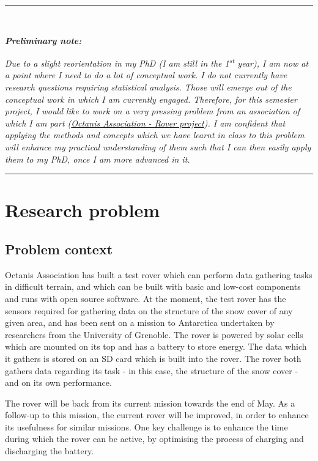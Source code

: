 \documentclass[11pt, UKenglish]{report}
\newcommand{\HRule}[1]{\rule{\linewidth}{#1}}
\begin{document}
\noindent \HRule{0.5pt} \\
\large{\textit{\textbf{Preliminary note:}}

\normalsize

\noindent \textit{Due to a slight reorientation in my PhD (I am still in the 1\textsuperscript{st} year), I am now at a point where I need to do a lot of conceptual work. I do not currently have research questions requiring statistical analysis. Those will emerge out of the conceptual work in which I am currently engaged. Therefore, for this semester project, I would like to work on a very pressing problem from an association of which I am part (\href{http://octanis.org/rover/} {Octanis Association - Rover project}). I am confident that applying the methods and concepts which we have learnt in class to this problem will enhance my practical understanding of them such that I can then easily apply them to my PhD, once I am more advanced in it.}

\noindent \HRule{0.5pt}


\section*{Research problem}

\subsection*{Problem context}

Octanis Association has built a test rover which can perform data gathering tasks in difficult terrain, and which can be built with basic and low-cost components and runs with open source software. At the moment, the test rover has the sensors required for gathering data on the structure of the snow cover of any given area, and has been sent on a mission  to Antarctica undertaken by researchers from the University of Grenoble. The rover is powered by solar cells which are mounted on its top and has a battery to store energy. The data which it gathers is stored on an SD card which is built into the rover. The rover both gathers data regarding its task - in this case, the structure of the snow cover - and on its own performance.

The rover will be back from its current mission towards the end of May. As a follow-up to this mission, the current rover will be improved, in order to enhance its usefulness for similar missions. One key challenge is to enhance the time during which the rover can be active, by optimising the process of charging and discharging the battery.

}
\end{document}
